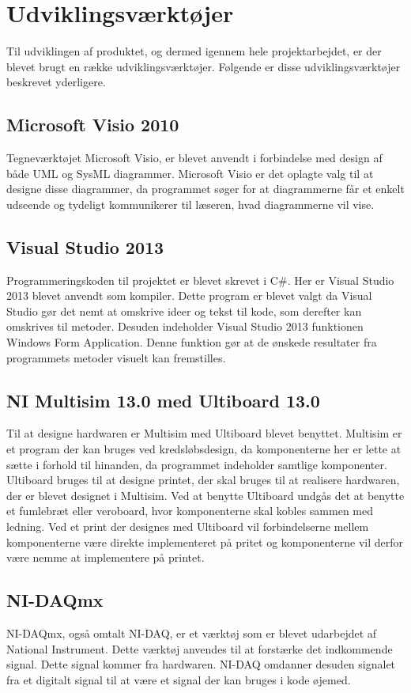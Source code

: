 \section{Udviklingsværktøjer}
Til udviklingen af produktet, og dermed igennem hele projektarbejdet, er der blevet brugt en række udviklingsværktøjer. Følgende er disse udviklingsværktøjer beskrevet yderligere.
\subsection{Microsoft Visio 2010}
Tegneværktøjet Microsoft Visio, er blevet anvendt i forbindelse med design af både UML og SysML diagrammer. Microsoft Visio er det oplagte valg til at designe disse diagrammer, da programmet søger for at diagrammerne får et enkelt udseende og tydeligt kommunikerer til læseren, hvad diagrammerne vil vise.
\subsection{Visual Studio 2013}
Programmeringskoden til projektet er blevet skrevet i C\#. Her er Visual Studio 2013 blevet anvendt som kompiler. Dette program er blevet valgt da Visual Studio gør det nemt at omskrive ideer og tekst til kode, som derefter kan omskrives til metoder. Desuden indeholder Visual Studio 2013 funktionen Windows Form Application. Denne funktion gør at de ønskede resultater fra programmets metoder visuelt kan fremstilles.
\subsection{NI Multisim 13.0 med Ultiboard 13.0}
Til at designe hardwaren er Multisim med Ultiboard blevet benyttet. Multisim er et program der kan bruges ved kredsløbsdesign, da komponenterne her er lette at sætte i forhold til hinanden, da programmet indeholder samtlige komponenter. Ultiboard bruges til at designe printet, der skal bruges til at realisere hardwaren, der er blevet designet i Multisim. Ved at benytte Ultiboard undgås det at benytte et fumlebræt eller veroboard, hvor komponenterne skal kobles sammen med ledning. Ved et print der designes med Ultiboard vil forbindelserne mellem komponenterne være direkte implementeret på pritet og komponenterne vil derfor være nemme at implementere på printet.
\subsection{NI-DAQmx}
NI-DAQmx, også omtalt NI-DAQ, er et værktøj som er blevet udarbejdet af National Instrument. Dette værktøj anvendes til at forstærke det indkommende signal. Dette signal kommer fra hardwaren. NI-DAQ omdanner desuden signalet fra et digitalt signal til at være et signal der kan bruges i kode øjemed. 
